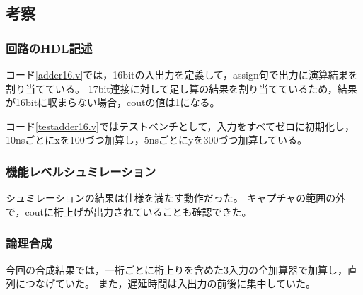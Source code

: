 \subsection{考察}
\subsubsection{回路のHDL記述}
コード\ref{adder16.v}では，16bitの入出力を定義して，assign句で出力に演算結果を割り当てている。
17bit連接に対して足し算の結果を割り当てているため，結果が16bitに収まらない場合，coutの値は1になる。

コード\ref{testadder16.v}ではテストベンチとして，入力をすべてゼロに初期化し，10nsごとにxを100づつ加算し，5nsごとにyを300づつ加算している。

\subsubsection{機能レベルシュミレーション}
シュミレーションの結果は仕様を満たす動作だった。
キャプチャの範囲の外で，coutに桁上げが出力されていることも確認できた。

\subsubsection{論理合成}
今回の合成結果では，一桁ごとに桁上りを含めた3入力の全加算器で加算し，直列につなげていた。
また，遅延時間は入出力の前後に集中していた。

